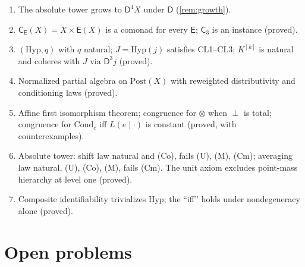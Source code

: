 \documentclass[11pt]{article}
\theoremstyle{definition}
\theoremstyle{remark}
\newcommand{\D}{\mathsf{D}}
\newcommand{\Hyp}{\mathrm{Hyp}}
\newcommand{\Post}{\mathrm{Post}}
\newcommand{\Cond}{\mathrm{Cond}}
\newcommand{\C}{\mathsf{C}}
\newcommand{\E}{\mathsf{E}}
\begin{document}
\begin{enumerate}[leftmargin=*]
  $(Y,g)\mapsto(\D Y,\beta_B\circ\D g)$, and bialgebras are convex spaces with an affine context map
  (proved). The ambient 2-category is $\mathbf{Cat}$; the resulting categories are locally discrete,
  so two-dimensional monad theory adds nothing here. The naive convex-order relaxation of the
  absolute tower fails: unit and multiplication comparisons have opposite orientations and the
  comultiplication defect is incomparable (proved, with exact certificates).
\item The absolute tower grows to $\D^4X$ under $\D$ (\cref{rem:growth}).
\item $\C_\E(X)=X\times\E(X)$ is a comonad for every $\E$; $\C_3$ is an instance (proved).
\item $(\Hyp,q)$ with $q$ natural; $J=\Hyp(j)$ satisfies CL1--CL3; $K^{[k]}$ is natural and coheres
  with $J$ via $\D^3j$ (proved).
\item Normalized partial algebra on $\Post(X)$ with reweighted distributivity and conditioning laws
  (proved).
\item Affine first isomorphism theorem; congruence for $\otimes$ when $\perp$ is total; congruence for
  $\Cond_e$ iff $L(e\mid\cdot)$ is constant (proved, with counterexamples).
\item Absolute tower: shift law natural and (Co), fails (U), (M), (Cm); averaging law natural,
  (U), (Co), (M), fails (Cm). The unit axiom excludes point-mass hierarchy at level one (proved).
\item Composite identifiability trivializes $\Hyp$; the ``iff'' holds under nondegeneracy alone (proved).
\end{enumerate}

\section{Open problems}
\end{document}
